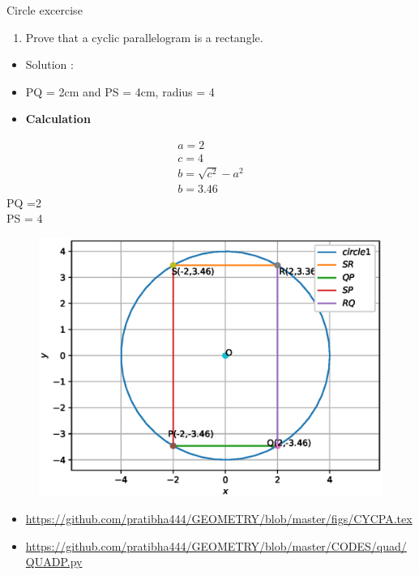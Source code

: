 \begin{frame}{Circle excercise}
\begin{enumerate}
\conti
\item Prove that a cyclic parallelogram is a rectangle.
\end{enumerate}
\seti
\begin{itemize}
\item Solution :
\begin{center}

\end{center}
\item PQ = 2cm and PS = 4cm, radius = 4
\end{itemize}
\end{frame}
\begin{frame}
\begin{itemize}
\item \textbf{Calculation}
\end{itemize}
\begin{align*}
a = 2\\
c = 4\\
b = \sqrt{c^2} - a ^2\\
b = 3.46
\end{align*}
PQ =2\\
PS = 4
\end{frame}
\begin{frame}
\begin{figure}
\includegraphics[scale=.4]{./figs/QUAD_P.eps}
\end{figure}
\begin{itemize}
\item\url{https://github.com/pratibha444/GEOMETRY/blob/master/figs/CYCPA.tex}
\item\url{https://github.com/pratibha444/GEOMETRY/blob/master/CODES/quad/QUADP.py}
\end{itemize}
\end{frame}
